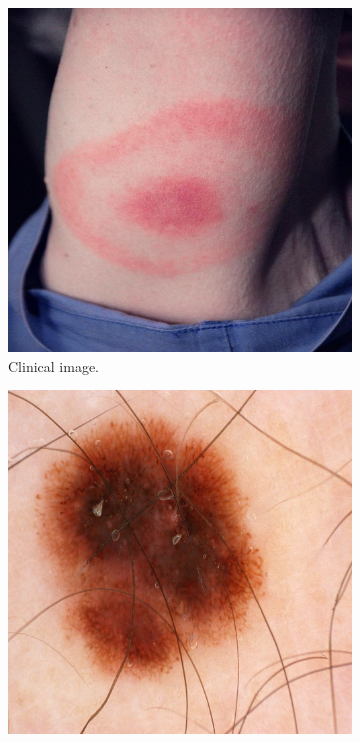 \begin{figure}[htb!]
	\centering
	\begin{subfigure}[b]{0.3\textwidth}
		\centering
		\includegraphics[width=\textwidth,keepaspectratio]{images/background/EM_bullseye.jpg}
		\caption{Clinical image.}
		\label{fig:EM-bullseye2}
	\end{subfigure}
	\hfill
	\begin{subfigure}[b]{0.3\textwidth}
		\centering
		\includegraphics[width=\textwidth,keepaspectratio]{images/background/dermoscopic_sample.png}

\end{subfigure}
\end{figure}
